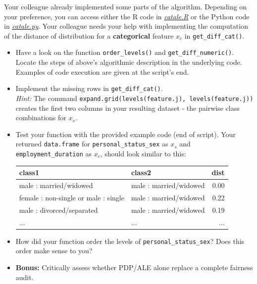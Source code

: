 {\begin{enumerate}[a)]
Your colleague already implemented some parts of the algorithm. Depending on your 
preference, you can access either the R code in \href{https://raw.githubusercontent.com/slds-lmu/lecture_iml/master/exercises/03_feature_effects/code/catale.R}{\textit{catale.R}} or the 
Python code in \href{https://raw.githubusercontent.com/slds-lmu/lecture_iml/master/exercises/03_feature_effects/code/catale.py}{\textit{catale.py}}.
Your colleague needs your help with implementing the computation of the distance of 
distribution for a \textbf{categorical} feature $x_c$ in 
\texttt{get\_diff\_cat()}. 

\begin{itemize}
  \item Have a look on the function \texttt{order\_levels()} and \texttt{get\_diff\_numeric()}. 
  Locate the steps of above's  algorithmic description in the underlying code.
  Examples of code execution are given at the script's end. 
  \item Implement the missing rows in \texttt{get\_diff\_cat()}.\\
  \textit{Hint:} The command \texttt{expand.grid(levels(feature.j), levels(feature.j))} creates the first two columns in 
your resulting dataset - the pairwise class combinations for $x_s$.
  \item Test your function with the provided example code (end of script). 
  Your returned \texttt{data.frame} for \texttt{personal\_status\_sex} as $x_s$ 
  and \texttt{employment\_duration} as $x_c$, should look 
  similar to this: 

\begin{table}[ht]
\centering
\begin{tabular}{llr}
  \hline
 class1 & class2 & dist \\ 
  \hline
male : married/widowed & male : married/widowed & 0.00 \\ 
female : non-single or male : single & male : married/widowed & 0.22 \\ 
male : divorced/separated & male : married/widowed & 0.19 \\ 
  ... & ... & ... \\
   \hline
\end{tabular}
\end{table}

\item How did your function order the levels of \texttt{personal\_status\_sex}? 
Does this order make sense to you? 

\item \textbf{Bonus:} Critically assess whether PDP/ALE alone replace a complete fairness audit.

\end{itemize}
\end{enumerate}
}
